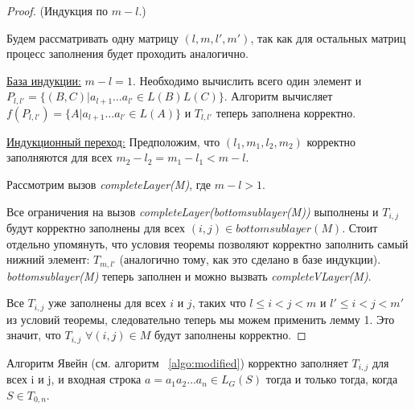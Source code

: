 \documentclass[14pt]{matmex-diploma-custom}
\begin{document}
\begin{proof}(Индукция по $m - l$.)

Будем рассматривать одну матрицу $(l, m, l', m')$, так как для остальных матриц процесс заполнения будет проходить аналогично.

\underline{База индукции:} $m - l = 1$. Необходимо вычислить всего один элемент и $P_{l, l'} =  \{ (B, C) |  a_{l + 1} \dots a_{l'} \in L(B)L(C)\}$. Алгоритм вычисляет $f(P_{l, l'}) = \{ A |  a_{l + 1} \dots a_{l'} \in L(A)\}$ и $T_{l, l'}$ теперь заполнена корректно.

\underline{Индукционный переход:} Предположим, что $(l_1, m_1, l_2, m_2)$ корректно заполняются для всех $m_2 - l_2 = m_1 - l_1 < m - l$.

Рассмотрим вызов \textit{completeLayer(M)}, где $m - l > 1$.

Все ограничения на вызов \textit{completeLayer(bottomsublayer(M))} выполнены и $T_{i, j}$ будут корректно заполнены для всех $(i, j) \in bottomsublayer(M)$. Стоит отдельно упомянуть, что условия теоремы позволяют корректно заполнить самый нижний элемент: $T_{m, l'}$ (аналогично тому, как это сделано в базе индукции).
\textit{bottomsublayer(M)} теперь заполнен и можно вызвать \textit{completeVLayer(M)}.

Все $T_{i,j}$ уже заполнены для всех $i$ и $j$, таких что $l \leq i < j < m$ и $l' \leq i < j < m'$ из условий теоремы, следовательно теперь мы можем применить лемму 1. Это значит, что $T_{i, j}$ $\forall (i, j) \in M$ будут заполнены корректно.
\end{proof}

\begin{theorem}
Алгоритм Явейн (см. алгоритм ~\ref{algo:modified}) корректно заполняет $T_{i, j}$ для всех i и j, и входная строка $a = a_{1}a_{2} \dots a_{n} \in L_{G}(S)$ тогда и только тогда, когда $S \in T_{0, n}$.
\end{theorem}
\end{document}
